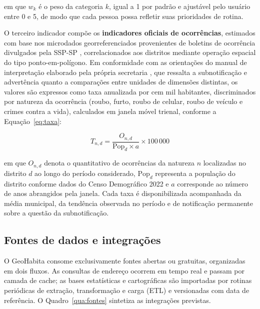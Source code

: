 \noindent em que $w_k$ é o peso da categoria $k$, igual a 1 por padrão e ajustável pelo usuário entre 0 e 5, de modo que cada pessoa possa refletir suas prioridades de rotina.

O terceiro indicador compõe os \textbf{indicadores oficiais de ocorrências}, estimados com base nos microdados georreferenciados provenientes de boletins de ocorrência divulgados pela SSP-SP \cite{ssp2025}, correlacionados aos distritos mediante operação espacial do tipo ponto-em-polígono. Em conformidade com as orientações do manual de interpretação elaborado pela própria secretaria \cite{ssp2005}, que ressalta a subnotificação e advertência quanto a comparações entre unidades de dimensões distintas, os valores são expressos como taxa anualizada por cem mil habitantes, discriminados por natureza da ocorrência (roubo, furto, roubo de celular, roubo de veículo e crimes contra a vida), calculados em janela móvel trienal, conforme a Equação~\ref{eq:taxa}:

\begin{equation}
\label{eq:taxa}
T_{n,d} = \frac{O_{n,d}}{\text{Pop}_d \times a} \times 100\,000
\end{equation}

\noindent em que $O_{n,d}$ denota o quantitativo de ocorrências da natureza $n$ localizadas no distrito $d$ ao longo do período considerado, $\text{Pop}_d$ representa a população do distrito conforme dados do Censo Demográfico 2022 \cite{ibge2022} e $a$ corresponde ao número de anos abrangidos pela janela. Cada taxa é disponibilizada acompanhada da média municipal, da tendência observada no período e de notificação permanente sobre a questão da subnotificação.

\subsection{Fontes de dados e integrações}

O GeoHabita consome exclusivamente fontes abertas ou gratuitas, organizadas em dois fluxos. As consultas de endereço ocorrem em tempo real e passam por camada de cache; as bases estatísticas e cartográficas são importadas por rotinas periódicas de extração, transformação e carga (ETL) e versionadas com data de referência. O Quadro~\ref{qua:fontes} sintetiza as integrações previstas.


